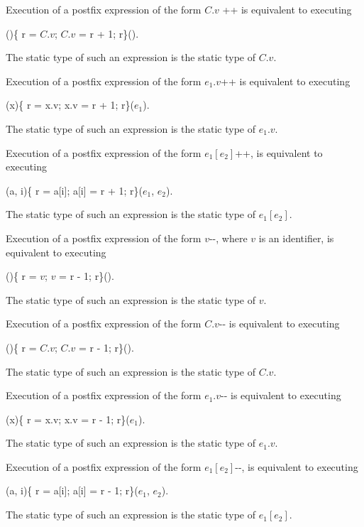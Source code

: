 \documentclass{article}
\newcommand{\code}[1]{{\sf #1}}
\begin{document}
\begin{itemize}
\LMHash{}
Execution of a postfix expression of the form \code{$C.v$ ++} is equivalent to executing

\code{()\{\VAR{} r = $C.v$; $C.v$ = r + 1; \RETURN{} r\}()}.

\LMHash{}
The static type of such an expression is the static type of $C.v$.


\LMHash{}
Execution of a postfix expression of the form \code{$e_1.v$++} is equivalent to executing

\code{(x)\{\VAR{} r = x.v; x.v = r + 1; \RETURN{} r\}($e_1$)}.

\LMHash{}
The static type of such an expression is the static type of $e_1.v$.


\LMHash{}
Execution of a postfix expression of the form \code{$e_1[e_2]$++},  is equivalent to executing

\code{(a, i)\{\VAR{} r = a[i]; a[i] = r + 1; \RETURN{} r\}($e_1$, $e_2$)}.

\LMHash{}
The static type of such an expression is the static type of $e_1[e_2]$.


\LMHash{}
Execution of a postfix expression of the form \code{$v$-{}-}, where $v$ is an identifier, is equivalent to executing

\code{()\{\VAR{} r = $v$; $v$ = r - 1; \RETURN{} r\}()}.

\LMHash{}
The static type of such an expression is the static type of $v$.


\LMHash{}
Execution of a postfix expression of the form \code{$C.v$-{}-} is equivalent to executing

\code{()\{\VAR{} r = $C.v$; $C.v$ = r - 1; \RETURN{} r\}()}.

\LMHash{}
The static type of such an expression is the static type of $C.v$.


\LMHash{}
Execution of a postfix expression of the form \code{$e_1.v$-{}-} is equivalent to executing

\code{(x)\{\VAR{} r = x.v; x.v = r - 1; \RETURN{} r\}($e_1$)}.

\LMHash{}
The static type of such an expression is the static type of $e_1.v$.


\LMHash{}
Execution of a postfix expression of the form \code{$e_1[e_2]$-{}-},  is equivalent to executing

\code{(a, i)\{\VAR{} r = a[i]; a[i] = r - 1; \RETURN{} r\}($e_1$, $e_2$)}.

\LMHash{}
The static type of such an expression is the static type of $e_1[e_2]$.


\end{itemize}
\end{document}
